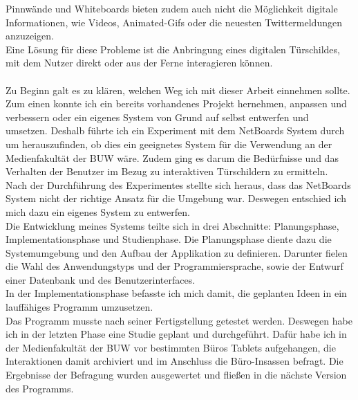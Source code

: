 Pinnwände und Whiteboards bieten zudem auch nicht die Möglichkeit digitale Informationen, wie Videos, Animated-Gifs oder die neuesten Twittermeldungen anzuzeigen.
\\
Eine Lösung für diese Probleme ist die Anbringung eines digitalen Türschildes, mit dem Nutzer direkt oder aus der Ferne interagieren können.
\\
\\
Zu Beginn galt es zu klären, welchen Weg ich mit dieser Arbeit einnehmen sollte. Zum einen konnte ich ein bereits vorhandenes Projekt hernehmen, anpassen und verbessern oder ein eigenes System von Grund auf selbst entwerfen und umsetzen.
Deshalb führte ich ein Experiment mit dem NetBoards System\cite{wood:2014,netboards:website} durch um herauszufinden, ob dies ein geeignetes System für die Verwendung an der Medienfakultät der BUW wäre. Zudem ging es darum die Bedürfnisse und das Verhalten der Benutzer im Bezug zu interaktiven Türschildern zu ermitteln.
\\
Nach der Durchführung des Experimentes stellte sich heraus, dass das NetBoards System nicht der richtige Ansatz für die Umgebung war. Deswegen entschied ich mich dazu ein eigenes System zu entwerfen.
\\
Die Entwicklung meines Systems teilte sich in drei Abschnitte: Planungsphase, Implementationsphase und Studienphase.
Die Planungsphase diente dazu die Systemumgebung und den Aufbau der Applikation zu definieren.
Darunter fielen die Wahl des Anwendungstyps und der Programmiersprache, sowie der Entwurf einer Datenbank und des Benutzerinterfaces.
\\
In der Implementationsphase befasste ich mich damit, die geplanten Ideen in ein lauffähiges Programm umzusetzen.
\\
Das Programm musste nach seiner Fertigstellung getestet werden. Deswegen habe ich in der letzten Phase eine Studie geplant und durchgeführt. Dafür habe ich in der Medienfakultät der BUW vor bestimmten Büros Tablets aufgehangen, die Interaktionen damit archiviert und im Anschluss die Büro-Insassen befragt. Die Ergebnisse der Befragung wurden ausgewertet und fließen in die nächste Version des Programms.